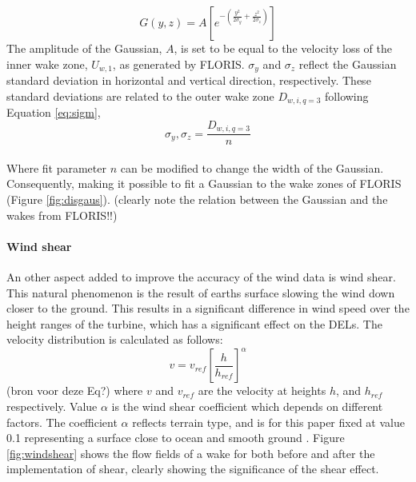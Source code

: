 \begin{equation}
\label{eq:gaus}
G(y, z) = A [e^{-(\frac{y^2}{2\sigma_y} + \frac{z^2}{2\sigma_z})}]
\end{equation}
The amplitude of the Gaussian, $A$, is set to be equal to the velocity loss of the inner wake zone, $U_{w,1}$, as generated by FLORIS. $\sigma_y$ and $\sigma_z$ reflect the Gaussian standard deviation in horizontal and vertical direction, respectively. These standard deviations are related to the outer wake zone $D_{w,i,q=3}$ following Equation \ref{eq:sigm},
\begin{equation}
\label{eq:sigm}
\sigma_y,\sigma_z = \frac{D_{w,i,q=3}}{n} 
\end{equation}
\\
Where fit parameter $n$ can be modified to change the width of the Gaussian. Consequently, making it possible to fit a Gaussian to the wake zones of FLORIS (Figure \ref{fig:disgaus}). (clearly note the relation between the Gaussian and the wakes from FLORIS!!)

\paragraph{Wind shear} \label{sec:windshear}
An other aspect added to improve the accuracy of the wind data is wind shear. This natural phenomenon is the result of earths surface slowing the wind down closer to the ground. This results in a significant difference in wind speed over the height ranges of the turbine, which has a significant effect on the DELs\cite{Firtin2011}.  The velocity distribution is calculated as follows: 
\begin{equation}
\label{eq:shear}
v = v_{ref} \left[\frac{h}{h_{ref}}\right]^\alpha
\end{equation}
(bron voor deze Eq?)
where $v$ and $v_{ref}$ are the velocity at heights $h$, and $h_{ref}$  respectively. Value $\alpha$ is the wind shear coefficient which depends on different factors. The coefficient $\alpha$  reflects terrain type, and is for this paper fixed at value 0.1 representing a surface close to ocean and smooth ground \cite{Firtin2011}. Figure \ref{fig:windshear} shows the flow fields of a wake for both before and after the implementation of shear, clearly showing the significance of the shear effect.


